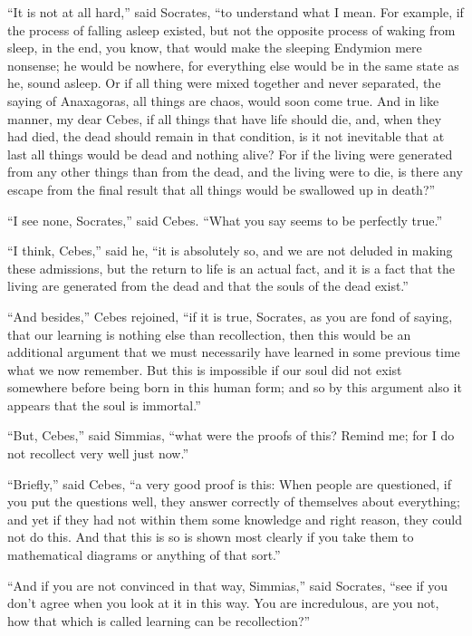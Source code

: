 \documentclass[letterpaper,12pt]{article}
\newcommand{\stephpag}[1]{\marginnote{\small\itshape\fontfamily{ppl}\selectfont #1}}
\begin{document}
\begin{drama}
``It is not at all hard,'' said Socrates, ``to understand what I mean. For example, if the process of falling asleep existed, but not the opposite process of waking from sleep, \stephpag{c} in the end, you know, that would make the sleeping Endymion mere nonsense; he would be nowhere, for everything else would be in the same state as he, sound asleep. Or if all thing were mixed together and never separated, the saying of Anaxagoras, all things are chaos, would soon come true. And in like manner, my dear Cebes, if all things that have life should die, and, when they had died, the dead should remain in that condition, is it not inevitable that at last all things would be dead \stephpag{d} and nothing alive? For if the living were generated from any other things than from the dead, and the living were to die, is there any escape from the final result that all things would be swallowed up in death?''
 
``I see none, Socrates,'' said Cebes. ``What you say seems to be perfectly true.''
 
``I think, Cebes,'' said he, ``it is absolutely so, and we are not deluded in making these admissions, but the return to life is an actual fact, and it is a fact that the living are generated from the dead and that the souls of the dead \stephpag{e} exist.''
 
``And besides,'' Cebes rejoined, ``if it is true, Socrates, as you are fond of saying, that our learning is nothing else than recollection, then this would be an additional argument that we must necessarily have learned in some previous time what we now remember. But this is impossible if \stephpag{73 a} our soul did not exist somewhere before being born in this human form; and so by this argument also it appears that the soul is immortal.''
 
``But, Cebes,'' said Simmias, ``what were the proofs of this? Remind me; for I do not recollect very well just now.''
 
``Briefly,'' said Cebes, ``a very good proof is this: When people are questioned, if you put the questions well, they answer correctly of themselves about everything; and yet if they had not within them some knowledge and right reason, they could not do this. And that this is so is shown most clearly if you take them \stephpag{b} to mathematical diagrams or anything of that sort.''
 
``And if you are not convinced in that way, Simmias,'' said Socrates, ``see if you don't agree when you look at it in this way. You are incredulous, are you not, how that which is called learning can be recollection?''
 

\end{drama}
\end{document}
